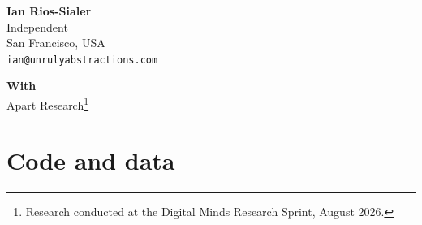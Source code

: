 \documentclass[11pt,letterpaper]{article}
\begin{document}

\begin{center}
{\bfseries Ian Rios-Sialer}\\
Independent\\
San Francisco, USA\\
\texttt{ian@unrulyabstractions.com}

\vspace{1em}
{\bfseries With}\\
Apart Research\footnote{Research conducted at the Digital Minds Research
Sprint, August 2026.}
\end{center}

\vspace{0.5em}

\begin{abstract}
\noindent
Can a model be steered to disidentify with being an AI assistant, and can
it detect that steering? We test both on Qwen3.6-27B, using two WeirdChat behaviours as target states: a claim to a physical body and a denial of
being an AI. We compare two steering methods. Direct contrastive steering
learns each behaviour direction as the difference of mean activations
between matched exhibiting and non-exhibiting replies; the directions separate held-out replies for both behaviours, and steering turns the body behaviour on in fluent text, confirmed by a judge running WeirdChat's own
rubric. A regulator choosing signed strengths on word-list J-space
directions steers nothing: a norm-matched decoy moves the readout more
than the target. A forced-choice letter probe confabulates at zero
injection, reading the conversation's own behaviour as an injection. Free-text answers at zero injection are ``none'' in all but two trials; under injection they fill with the injected concept's vocabulary instead of naming it. Introspection reports explicit context, not internal steering.
\end{abstract}





\FloatBarrier



\section*{Code and data}
\end{document}
